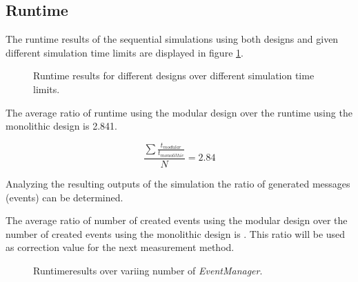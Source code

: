 \subsection{Runtime}
\label{sec:measurements_sequential_runtime}

The runtime results of the sequential simulations using both designs and given different simulation time limits are displayed in figure \ref{fig:results_runtime_sim_time}.

\begin{figure}
    \centering
    \caption{Runtime results for different designs over different simulation time limits.}
    \label{fig:results_runtime_sim_time}
\end{figure}

The average ratio of runtime using the modular design over the runtime using the monolithic design is 2.841.

\[\frac{\sum\frac{t_{modular}}{t_{monolithic}}}{N} = 2.84\]

Analyzing the resulting outputs of the simulation the ratio of generated messages (events) can be determined.


The average ratio of number of created events using the modular design over the number of created events using the monolithic design is .%
This ratio will be used as correction value for the next measurement method.

\begin{figure}
    \centering
    \caption{Runtimeresults over variing number of \emph{EventManager}.}
    \label{fig:results_runtime_eventmanager}
\end{figure}

